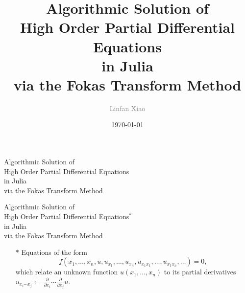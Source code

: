 \documentclass{beamer}
\title[]{Algorithmic Solution of \\High Order Partial Differential Equations\\in Julia\\ via the Fokas Transform Method} %
\author[]{\textcolor{gray}{Linfan Xiao}} %
\institute[] %
{
Advisor: Prof. Dave Smith\\
Mathematical, Computational, and Statistical Sciences\\
Yale-NUS College \\ %
\medskip
}
\date[]{\today} %
\begin{document}
%
%

\begin{frame}
\titlepage %
\end{frame}

\begin{frame}[t]
    \begin{tcolorbox}[colback=white,colframe=gray!40, arc=0pt, outer arc=0pt]
        \begin{center}
            \Large Algorithmic Solution of \\
            High Order Partial Differential Equations\\
            in Julia\\
            via the Fokas Transform Method
        \end{center}
    \end{tcolorbox}
\end{frame}

\begin{frame}[t]
    \begin{tcolorbox}[colback=white,colframe=gray!40, arc=0pt, outer arc=0pt]
        \begin{center}
            \Large {\color{lightgray}Algorithmic Solution of \\
            High Order} Partial Differential Equations$^*$\\
            {\color{lightgray}in Julia\\
            via the Fokas Transform Method}
        \end{center}
    \end{tcolorbox}
    \begin{itemize}
        \item[$*$] Equations of the form 
        \[f\left(x_1,\ldots, x_n, u, u_{x_1},\ldots,u_{x_n},u_{x_1 x_1},\ldots,u_{x_1 x_n},\ldots \right) = 0,\]
        which relate an unknown function $u(x_1,\ldots,x_n)$ to its partial derivatives $u_{x_i\cdots x_j} := \frac{\partial}{\partial x_i}\cdots \frac{\partial}{\partial x_j}u$.
    \end{itemize}
\end{frame}
\end{document}
